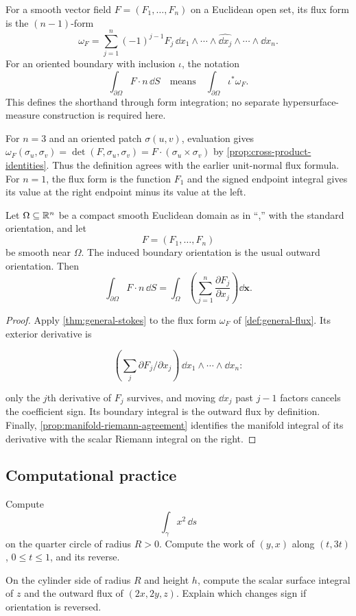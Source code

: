 \begin{definition}\label{def:general-flux}
For a smooth vector field $F=(F_1,\ldots,F_n)$ on a Euclidean open set,
its flux form is the $(n-1)$-form
\[
\omega_F=\sum_{j=1}^n(-1)^{j-1}F_j\,
\dd x_1\wedge\cdots\wedge\widehat{\dd x_j}\wedge\cdots\wedge\dd x_n.
\]
For an oriented boundary with inclusion $\iota$, the notation
\[
\int_{\partial\Omega}F\cdot n\,\dd S
\quad\text{means}\quad\int_{\partial\Omega}\iota^*\omega_F.
\]
This defines the shorthand through form integration; no separate
hypersurface-measure construction is required here.
\end{definition}
For $n=3$ and an oriented patch $\sigma(u,v)$, evaluation gives
$\omega_F(\sigma_u,\sigma_v)=\det(F,\sigma_u,\sigma_v)
=F\cdot(\sigma_u\times\sigma_v)$ by \cref{prop:cross-product-identities}.
Thus the definition agrees with the earlier unit-normal flux formula.
For $n=1$, the flux form is the function $F_1$ and the signed endpoint
integral gives its value at the right endpoint minus its value at the left.

\begin{corollary}
Let $\Omega\subseteq\mathbb{R}^n$ be a compact smooth Euclidean domain as in
``,'' with the standard orientation, and let
\[
F=(F_1,\ldots,F_n)
\]
be smooth near $\Omega$. The induced boundary orientation is the usual
outward orientation. Then
\[
\int_{\partial\Omega}F\cdot n\,\dd S
=
\int_\Omega
\left(\sum_{j=1}^{n}\frac{\partial F_j}{\partial x_j}\right)\dd\mathbf{x}.
\]
\end{corollary}
\begin{proof}
Apply \cref{thm:general-stokes} to the flux form $\omega_F$ of
\cref{def:general-flux}. Its exterior derivative is

\[
(\sum_j\partial F_j/\partial x_j)\,\dd x_1\wedge\cdots\wedge\dd x_n:
\]

only the $j$th derivative of $F_j$ survives, and moving $\dd x_j$ past
$j-1$ factors cancels the coefficient sign. Its boundary integral is
the outward flux by definition. Finally,
\cref{prop:manifold-riemann-agreement} identifies the manifold integral
of its derivative with the scalar Riemann integral on the right.
\end{proof}




\subsection*{Computational practice}
\begin{exercise}
Compute
\[
\int_\gamma x^2\,\dd s
\]
 on the quarter circle of radius $R>0$.
Compute the work of $(y,x)$ along $(t,3t)$, $0\leq t\leq1$, and its reverse.
\end{exercise}
\begin{exercise}
On the cylinder side of radius $R$ and height $h$, compute the scalar
surface integral of $z$ and the outward flux of $(2x,2y,z)$.
Explain which changes sign if orientation is reversed.
\end{exercise}

